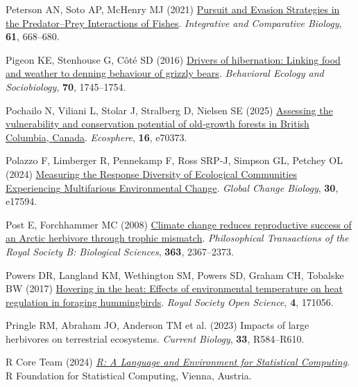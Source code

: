 \documentclass[
  12pt,
]{article}
\newlength{\cslhangindent}
\newenvironment{CSLReferences}[2] %
 {\begin{list}{}{%
  \setlength{\itemindent}{0pt}
  \setlength{\leftmargin}{0pt}
  \setlength{\parsep}{0pt}
  \ifodd #1
   \setlength{\leftmargin}{\cslhangindent}
   \setlength{\itemindent}{-1\cslhangindent}
  \fi
  \setlength{\itemsep}{#2\baselineskip}}}
 {\end{list}}
\begin{document}
\begin{CSLReferences}{1}{0}
Peterson AN, Soto AP, McHenry MJ (2021) \href{https://doi.org/10.1093/icb/icab116}{Pursuit and {Evasion} {Strategies} in the {Predator}--{Prey} {Interactions} of {Fishes}}. \emph{Integrative and Comparative Biology}, \textbf{61}, 668--680.

Pigeon KE, Stenhouse G, Côté SD (2016) \href{https://doi.org/10.1007/s00265-016-2180-5}{Drivers of hibernation: Linking food and weather to denning behaviour of grizzly bears}. \emph{Behavioral Ecology and Sociobiology}, \textbf{70}, 1745--1754.

Pochailo N, Viliani L, Stolar J, Stralberg D, Nielsen SE (2025) \href{https://doi.org/10.1002/ecs2.70373}{Assessing the vulnerability and conservation potential of old‐growth forests in {British} {Columbia}, {Canada}}. \emph{Ecosphere}, \textbf{16}, e70373.

Polazzo F, Limberger R, Pennekamp F, Ross SRP‐J, Simpson GL, Petchey OL (2024) \href{https://doi.org/10.1111/gcb.17594}{Measuring the {Response} {Diversity} of {Ecological} {Communities} {Experiencing} {Multifarious} {Environmental} {Change}}. \emph{Global Change Biology}, \textbf{30}, e17594.

Post E, Forchhammer MC (2008) \href{https://doi.org/10.1098/rstb.2007.2207}{Climate change reduces reproductive success of an {Arctic} herbivore through trophic mismatch}. \emph{Philosophical Transactions of the Royal Society B: Biological Sciences}, \textbf{363}, 2367--2373.

Powers DR, Langland KM, Wethington SM, Powers SD, Graham CH, Tobalske BW (2017) \href{https://doi.org/10.1098/rsos.171056}{Hovering in the heat: Effects of environmental temperature on heat regulation in foraging hummingbirds}. \emph{Royal Society Open Science}, \textbf{4}, 171056.

{Pringle RM, Abraham JO, Anderson TM et al.} (2023) Impacts of large herbivores on terrestrial ecosystems. \emph{Current Biology}, \textbf{33}, R584--R610.

R Core Team (2024) \emph{\emph{\href{https://www.R-project.org/}{R: {A} {Language} and {Environment} for {Statistical} {Computing}}}}. R Foundation for Statistical Computing, Vienna, Austria.


\end{CSLReferences}
\end{document}
